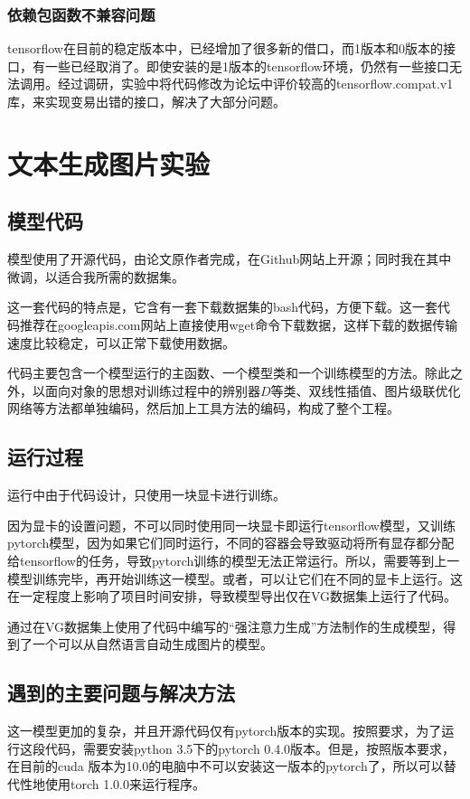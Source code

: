 \subsubsection{依赖包函数不兼容问题}
tensorflow在目前的稳定版本中，已经增加了很多新的借口，而1版本和0版本的接口，有一些已经取消了。即使安装的是1版本的tensorflow环境，仍然有一些接口无法调用。经过调研，实验中将代码修改为论坛中评价较高的tensorflow.compat.v1库，来实现变易出错的接口，解决了大部分问题。

\section{文本生成图片实验}
\subsection{模型代码}
模型使用了开源代码，由论文原作者完成，在Github网站上开源；同时我在其中微调，以适合我所需的数据集。

这一套代码的特点是，它含有一套下载数据集的bash代码，方便下载。这一套代码推荐在googleapis.com网站上直接使用wget命令下载数据，这样下载的数据传输速度比较稳定，可以正常下载使用数据。

代码主要包含一个模型运行的主函数、一个模型类和一个训练模型的方法。除此之外，以面向对象的思想对训练过程中的辨别器$D$等类、双线性插值、图片级联优化网络等方法都单独编码，然后加上工具方法的编码，构成了整个工程。

\subsection{运行过程}
运行中由于代码设计，只使用一块显卡进行训练。

因为显卡的设置问题，不可以同时使用同一块显卡即运行tensorflow模型，又训练pytorch模型，因为如果它们同时运行，不同的容器会导致驱动将所有显存都分配给tensorflow的任务，导致pytorch训练的模型无法正常运行。所以，需要等到上一模型训练完毕，再开始训练这一模型。或者，可以让它们在不同的显卡上运行。这在一定程度上影响了项目时间安排，导致模型导出仅在VG数据集上运行了代码。

通过在VG数据集上使用了代码中编写的“强注意力生成”方法制作的生成模型，得到了一个可以从自然语言自动生成图片的模型。

\subsection{遇到的主要问题与解决方法}
这一模型更加的复杂，并且开源代码仅有pytorch版本的实现。按照要求，为了运行这段代码，需要安装python 3.5下的pytorch 0.4.0版本。但是，按照版本要求，在目前的cuda 版本为10.0的电脑中不可以安装这一版本的pytorch了，所以可以替代性地使用torch 1.0.0来运行程序。

